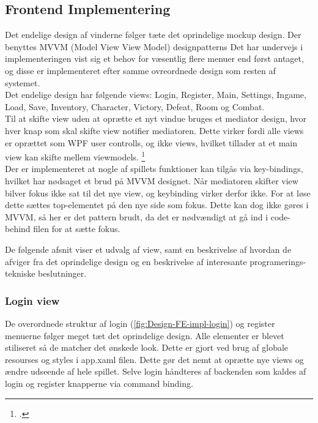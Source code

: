 \subsection{Frontend Implementering}

Det endelige design af vinderne følger tæte det oprindelige mockup design. Der benyttes MVVM (Model View View Model) designpatterns  Det har undervejs i implementeringen vist sig et behov for væsentlig flere menuer end først antaget, og disse er implementeret efter samme ovreordnede design som resten af systemet.\\
Det endelige design har følgende views: Login, Register, Main, Settings, Ingame, Load, Save, Inventory, Character, Victory, Defeat, Room og Combat.\\
Til at skifte view uden at oprætte et nyt vindue bruges et mediator design, hvor hver knap som skal skifte view notifier mediatoren. Dette virker fordi alle views er oprættet som WPF user controlls, og ikke views, hvilket tillader at et main view kan skifte mellem viewmodels. \footcite{https://www.technical-recipes.com/2018/navigating-between-views-in-wpf-mvvm/}\\

\noindent Der er implementeret at nogle af spillets funktioner kan tilgås via key-bindings, hvilket har nødsaget et brud på MVVM designet. Når mediatoren skifter view bilver fokus ikke sat til det nye view, og keybinding virker derfor ikke. For at løse dette sættes top-elementet på den nye side som fokus. Dette kan dog ikke gøres i MVVM, så her er det pattern brudt, da det er nødvændigt at gå ind i code-behind filen for at sætte fokus.

\noindent De følgende afsnit viser et udvalg af view, samt en beskrivelse af hvordan de afviger fra det oprindelige design og en beskrivelse af interesante programerings-tekniske beslutninger.

\subsubsection{Login view}
De overordnede struktur af login (\autoref{fig:Design-FE-impl-login}) og register menuerne følger meget tæt det oprindelige design. Alle elementer er blevet stiliseret så de matcher det ønskede look. Dette er gjort ved brug af globale resourses og styles i app.xaml filen. Dette gør det nemt at oprætte nye views og ændre udseende af hele spillet. Selve login håndteres af backenden som kaldes af login og register knapperne via command binding.

